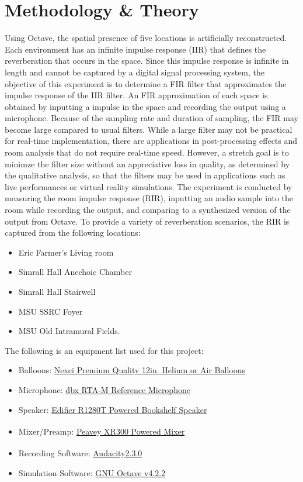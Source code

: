 \documentclass[letterpaper, 11pt, onecolumn, oneside]{article}
\begin{document}
\section{Methodology \& Theory}
Using Octave, the spatial presence of five locations is artificially reconstructed.
Each environment has an infinite impulse response (IIR) that defines the reverberation that occurs in the space.
Since this impulse response is infinite in length and cannot be captured by a digital signal processing system, the objective of this experiment is to determine a FIR filter that approximates the impulse response of the IIR filter.
An FIR approximation of each space is obtained by inputting a impulse in the space and recording the output using a microphone.
Because of the sampling rate and duration of sampling, the FIR may become large compared to usual filters.
While a large filter may not be practical for real-time implementation, there are applications in post-processing effects and room analysis that do not require real-time speed.
However, a stretch goal is to minimze the filter size without an appreciative loss in quality, as determined by the qualitative analysis, so that the filters may be used in applications such as live performances or virtual reality simulations.
The experiment is conducted by measuring the room impulse response (RIR), inputting an audio sample into the room while recording the output, and comparing to a synthesized version of the output from Octave.
To provide a variety of reverberation scenarios, the RIR is captured from the following locations:
\begin{itemize}
    \item Eric Farmer's Living room
    \item Simrall Hall Anechoic Chamber
    \item Simrall Hall Stairwell
    \item MSU SSRC Foyer
    \item MSU Old Intramural Fields.
\end{itemize}

The following is an equipment list used for this project:
\begin{itemize}
    \item Balloons: \href{https://www.amazon.com/gp/product/B01LBTKVDY/ref=oh_aui_detailpage_o04_s00?ie=UTF8&psc=1}{Nexci Premium Quality 12in. Helium or Air Balloons}
    \item Microphone: \href{https://dbxpro.com/en/products/rta-m}{dbx RTA-M Reference Microphone}
    \item Speaker: \href{https://www.edifier.com/int/en/speakers/studio-1280t-2.0-powered-bookshelf}{Edifier R1280T Powered Bookshelf Speaker}
    \item Mixer/Preamp: \href{https://assets.peavey.com/literature/manuals/117405_9170.pdf}{Peavey XR\texorpdfstring{\textsuperscript{\textregistered}} 8300 Powered Mixer}
    \item Recording Software: \href{https://www.audacityteam.org/}{Audacity\texorpdfstring{\textsuperscript{\textregistered}} v2.3.0}
    \item Simulation Software: \href{https://www.gnu.org/software/octave/}{GNU Octave v4.2.2}
\end{itemize}
\end{document}
